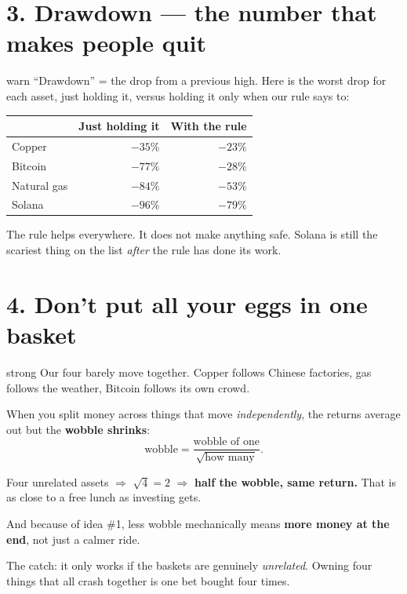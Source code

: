 \documentclass[12pt,a4paper]{article}
\begin{document}
\section{3. Drawdown --- the number that makes people quit}

\begin{kbox}{warn}
``Drawdown'' = the drop from a previous high. Here is the worst drop
for each asset, just holding it, versus holding it only when our rule
says to:

\vspace{0.4em}
\centering
\begin{tabular}{@{}lrr@{}}
    \toprule
    & \textbf{Just holding it} & \textbf{With the rule} \\
    \midrule
    Copper       & $-35\%$ & $-23\%$ \\
    Bitcoin      & $-77\%$ & $-28\%$ \\
    Natural gas  & $-84\%$ & $-53\%$ \\
    Solana       & $-96\%$ & $-79\%$ \\
    \bottomrule
\end{tabular}

\vspace{0.5em}
\raggedright
The rule helps everywhere. It does not make anything safe. Solana is
still the scariest thing on the list \emph{after} the rule has done its
work.
\end{kbox}

\section{4. Don't put all your eggs in one basket}

\begin{kbox}{strong}
Our four barely move together. Copper follows Chinese factories,
gas follows the weather, Bitcoin follows its own crowd.

\vspace{0.4em}
When you split money across things that move \emph{independently},
the returns average out but the \textbf{wobble shrinks}:
\[
    \text{wobble} = \frac{\text{wobble of one}}{\sqrt{\text{how many}}}.
\]

\vspace{0.3em}
Four unrelated assets $\Rightarrow$ $\sqrt{4}=2$ $\Rightarrow$
\textbf{half the wobble, same return.} That is as close to a free
lunch as investing gets.

\vspace{0.4em}
And because of idea \#1, less wobble mechanically means \textbf{more
money at the end}, not just a calmer ride.

\vspace{0.4em}
The catch: it only works if the baskets are genuinely
\emph{unrelated}. Owning four things that all crash together is one
bet bought four times.
\end{kbox}
\end{document}
